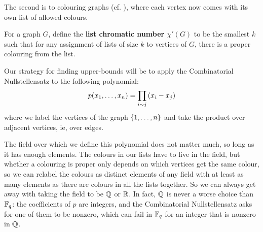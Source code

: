 The second is to colouring graphs (cf. ), where each vertex now comes with its own list of allowed colours.

\begin{boxdefinition}
    For a graph $G$, define the \textbf{list chromatic number $\chi'(G)$} to be the smallest $k$ such that for any assignment of lists of size $k$ to vertices of $G$, there is a proper colouring from the list.
\end{boxdefinition}

Our strategy for finding upper-bounds will be to apply the Combinatorial Nullstellensatz to the following polynomial:
\begin{align*}
    p\!\left( x_1, \ldots, x_n \right) = \prod_{i \sim j} \left( x_i - x_j \right)
\end{align*}
where we label the vertices of the graph $\left\{ 1, \ldots, n \right\}$ and take the product over adjacent vertices, ie, over edges.

The field over which we define this polynomial does not matter much, so long as it has enough elements. The colours in our lists have to live in the field, but whether a colouring is proper only depends on which vertices get the same colour, so we can relabel the colours as distinct elements of any field with at least as many elements as there are colours in all the lists together. So we can always get away with taking the field to be $\mathbb{Q}$ or $\mathbb{R}$. In fact, $\mathbb{Q}$ is never a worse choice than $\mathbb{F}_q$: the coefficients of $p$ are integers, and the Combinatorial Nullstellensatz asks for one of them to be nonzero, which can fail in $\mathbb{F}_q$ for an integer that is nonzero in $\mathbb{Q}$.
